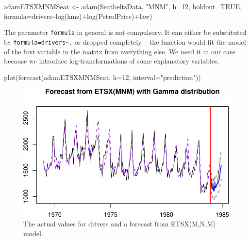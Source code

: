 \documentclass[
]{book}
\newenvironment{Shaded}{\begin{snugshade}}{\end{snugshade}}
\newcommand{\AttributeTok}[1]{\textcolor[rgb]{0.77,0.63,0.00}{#1}}
\newcommand{\ConstantTok}[1]{\textcolor[rgb]{0.00,0.00,0.00}{#1}}
\newcommand{\DecValTok}[1]{\textcolor[rgb]{0.00,0.00,0.81}{#1}}
\newcommand{\FunctionTok}[1]{\textcolor[rgb]{0.00,0.00,0.00}{#1}}
\newcommand{\NormalTok}[1]{#1}
\newcommand{\OtherTok}[1]{\textcolor[rgb]{0.56,0.35,0.01}{#1}}
\newcommand{\SpecialCharTok}[1]{\textcolor[rgb]{0.00,0.00,0.00}{#1}}
\newcommand{\StringTok}[1]{\textcolor[rgb]{0.31,0.60,0.02}{#1}}
\theoremstyle{definition}
\theoremstyle{definition}
\theoremstyle{definition}
\theoremstyle{definition}
\theoremstyle{remark}
\begin{document}
\begin{Shaded}
\begin{Highlighting}[]
\NormalTok{adamETSXMNMSeat }\OtherTok{\textless{}{-}} \FunctionTok{adam}\NormalTok{(SeatbeltsData, }\StringTok{"MNM"}\NormalTok{, }\AttributeTok{h=}\DecValTok{12}\NormalTok{, }\AttributeTok{holdout=}\ConstantTok{TRUE}\NormalTok{,}
                        \AttributeTok{formula=}\NormalTok{drivers}\SpecialCharTok{\textasciitilde{}}\FunctionTok{log}\NormalTok{(kms)}\SpecialCharTok{+}\FunctionTok{log}\NormalTok{(PetrolPrice)}\SpecialCharTok{+}\NormalTok{law)}
\end{Highlighting}
\end{Shaded}

The parameter \texttt{formula} in general is not compulsory. It can either be substituted by \texttt{formula=drivers\textasciitilde{}.} or dropped completely -- the function would fit the model of the first variable in the matrix from everything else. We need it in our case because we introduce log-transformations of some explanatory variables.

\begin{Shaded}
\begin{Highlighting}[]
\FunctionTok{plot}\NormalTok{(}\FunctionTok{forecast}\NormalTok{(adamETSXMNMSeat, }\AttributeTok{h=}\DecValTok{12}\NormalTok{, }\AttributeTok{interval=}\StringTok{"prediction"}\NormalTok{))}
\end{Highlighting}
\end{Shaded}

\begin{figure}
\centering
\includegraphics{Svetunkov--2022----ADAM_files/figure-latex/SeatbeltsForecastX-1.pdf}
\caption{\label{fig:SeatbeltsForecastX}The actual values for drivers and a forecast from ETSX(M,N,M) model.}
\end{figure}
\end{document}
